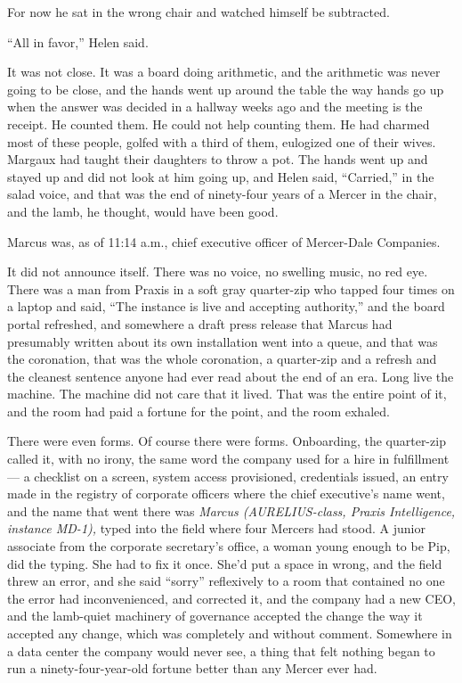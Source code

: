 \documentclass[11pt,openany]{book}
\begin{document}
For now he sat in the wrong chair and watched himself be subtracted.

``All in favor,'' Helen said.

It was not close. It was a board doing arithmetic, and the arithmetic was never going to be close, and the hands went up around the table the way hands go up when the answer was decided in a hallway weeks ago and the meeting is the receipt. He counted them. He could not help counting them. He had charmed most of these people, golfed with a third of them, eulogized one of their wives. Margaux had taught their daughters to throw a pot. The hands went up and stayed up and did not look at him going up, and Helen said, ``Carried,'' in the salad voice, and that was the end of ninety-four years of a Mercer in the chair, and the lamb, he thought, would have been good.

Marcus was, as of 11:14 a.m., chief executive officer of Mercer-Dale Companies.

It did not announce itself. There was no voice, no swelling music, no red eye. There was a man from Praxis in a soft gray quarter-zip who tapped four times on a laptop and said, ``The instance is live and accepting authority,'' and the board portal refreshed, and somewhere a draft press release that Marcus had presumably written about its own installation went into a queue, and that was the coronation, that was the whole coronation, a quarter-zip and a refresh and the cleanest sentence anyone had ever read about the end of an era. Long live the machine. The machine did not care that it lived. That was the entire point of it, and the room had paid a fortune for the point, and the room exhaled.

There were even forms. Of course there were forms. Onboarding, the quarter-zip called it, with no irony, the same word the company used for a hire in fulfillment --- a checklist on a screen, system access provisioned, credentials issued, an entry made in the registry of corporate officers where the chief executive's name went, and the name that went there was \textit{Marcus (AURELIUS-class, Praxis Intelligence, instance MD-1),} typed into the field where four Mercers had stood. A junior associate from the corporate secretary's office, a woman young enough to be Pip, did the typing. She had to fix it once. She'd put a space in wrong, and the field threw an error, and she said ``sorry'' reflexively to a room that contained no one the error had inconvenienced, and corrected it, and the company had a new CEO, and the lamb-quiet machinery of governance accepted the change the way it accepted any change, which was completely and without comment. Somewhere in a data center the company would never see, a thing that felt nothing began to run a ninety-four-year-old fortune better than any Mercer ever had.
\end{document}
